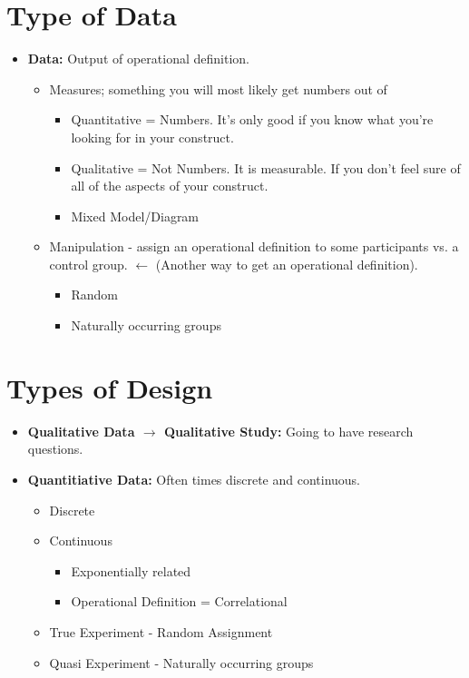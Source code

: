 \documentclass{report}
\begin{document}
\section{Type of Data}
\begin{itemize}
    \item \textbf{Data:} Output of operational definition.
    \begin{itemize}
        \item Measures; something you will most likely get numbers out of
        \begin{itemize}
            \item Quantitative = Numbers. It's only good if you know what you're looking for in your construct. 
            \item Qualitative = Not Numbers. It is measurable. If you don't feel sure of all of the aspects of your construct.
            \item Mixed Model/Diagram
        \end{itemize}
        \item Manipulation - assign an operational definition to some participants vs. a control group. $\leftarrow$ (Another way to get an operational definition).
        \begin{itemize}
            \item Random
            \item Naturally occurring groups
        \end{itemize}
    \end{itemize}
\end{itemize}

\section{Types of Design}
\begin{itemize}
    \item \textbf{Qualitative Data $\rightarrow$ Qualitative Study:} Going to have research questions. 
    \item \textbf{Quantitiative Data:} Often times discrete and continuous. 
    \begin{itemize}
        \item Discrete
        \item Continuous 
        \begin{itemize}
            \item Exponentially related
            \item Operational Definition = Correlational
        \end{itemize}
    \end{itemize}
    \begin{itemize}
        \item True Experiment - Random Assignment 
        \item Quasi Experiment - Naturally occurring groups
    \end{itemize}
\end{itemize}
\end{document}
